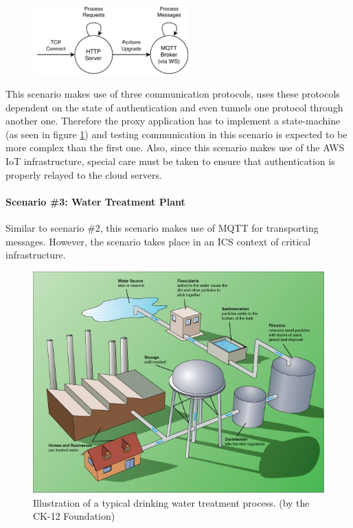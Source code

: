 \begin{figure}[ht]
    \centering
    \includegraphics[width=6cm]{img/ch04/Statemachine 2.pdf}
    \label{fig:aws-statemachine}
\end{figure}
This scenario makes use of three communication protocols, uses these protocols dependent on the state of authentication and even tunnels one protocol through another one. Therefore the proxy application has to implement a state-machine (as seen in figure \ref{fig:aws-statemachine}) and testing communication in this scenario is expected to be more complex than the first one. Also, since this scenario makes use of the \ac{AWS} \ac{IoT} infrastructure, special care must be taken to ensure that authentication is properly relayed to the cloud servers.


\paragraph{Scenario \#3: Water Treatment Plant}
\label{par:scenario-3}Similar to scenario \#2, this scenario makes use of \ac{MQTT} for transporting messages. However, the scenario takes place in an \ac{ICS} context of critical infrastructure.

\begin{figure}[hb]
    \centering
    \includegraphics[width=12cm]{img/ch04/watertreatmentplant.png}
    \caption[Illustration of a typical drinking water treatment process. (by the CK-12 Foundation)]{Illustration of a typical drinking water treatment process. (by the CK-12 Foundation)\protect\footnotemark}
    \label{fig:water-treatment}
\end{figure}

